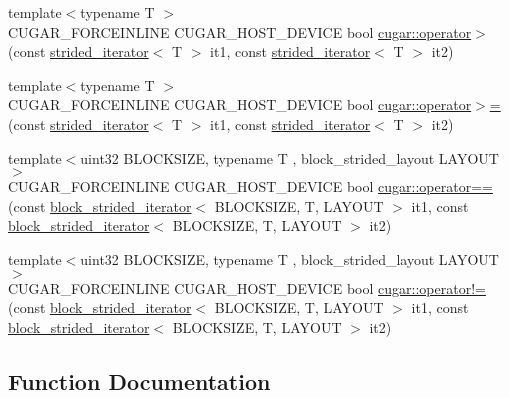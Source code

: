 \begin{DoxyCompactItemize}
\item 
{\footnotesize template$<$typename T $>$ }\\C\+U\+G\+A\+R\+\_\+\+F\+O\+R\+C\+E\+I\+N\+L\+I\+NE C\+U\+G\+A\+R\+\_\+\+H\+O\+S\+T\+\_\+\+D\+E\+V\+I\+CE bool \hyperlink{group___iterators_ga1e9e6257c01330e7b3620c9f3a81ee8f}{cugar\+::operator$>$} (const \hyperlink{structcugar_1_1strided__iterator}{strided\+\_\+iterator}$<$ T $>$ it1, const \hyperlink{structcugar_1_1strided__iterator}{strided\+\_\+iterator}$<$ T $>$ it2)
\item 
{\footnotesize template$<$typename T $>$ }\\C\+U\+G\+A\+R\+\_\+\+F\+O\+R\+C\+E\+I\+N\+L\+I\+NE C\+U\+G\+A\+R\+\_\+\+H\+O\+S\+T\+\_\+\+D\+E\+V\+I\+CE bool \hyperlink{group___iterators_ga9e4c4ee0e4663d9e1c671a22056c9533}{cugar\+::operator$>$=} (const \hyperlink{structcugar_1_1strided__iterator}{strided\+\_\+iterator}$<$ T $>$ it1, const \hyperlink{structcugar_1_1strided__iterator}{strided\+\_\+iterator}$<$ T $>$ it2)
\item 
{\footnotesize template$<$uint32 B\+L\+O\+C\+K\+S\+I\+ZE, typename T , block\+\_\+strided\+\_\+layout L\+A\+Y\+O\+UT$>$ }\\C\+U\+G\+A\+R\+\_\+\+F\+O\+R\+C\+E\+I\+N\+L\+I\+NE C\+U\+G\+A\+R\+\_\+\+H\+O\+S\+T\+\_\+\+D\+E\+V\+I\+CE bool \hyperlink{group___iterators_ga465edad50b0d8fadcb83a0eb90255327}{cugar\+::operator==} (const \hyperlink{structcugar_1_1block__strided__iterator}{block\+\_\+strided\+\_\+iterator}$<$ B\+L\+O\+C\+K\+S\+I\+ZE, T, L\+A\+Y\+O\+UT $>$ it1, const \hyperlink{structcugar_1_1block__strided__iterator}{block\+\_\+strided\+\_\+iterator}$<$ B\+L\+O\+C\+K\+S\+I\+ZE, T, L\+A\+Y\+O\+UT $>$ it2)
\item 
{\footnotesize template$<$uint32 B\+L\+O\+C\+K\+S\+I\+ZE, typename T , block\+\_\+strided\+\_\+layout L\+A\+Y\+O\+UT$>$ }\\C\+U\+G\+A\+R\+\_\+\+F\+O\+R\+C\+E\+I\+N\+L\+I\+NE C\+U\+G\+A\+R\+\_\+\+H\+O\+S\+T\+\_\+\+D\+E\+V\+I\+CE bool \hyperlink{group___iterators_gae35c875eb7c9a47d37f677f1df67f7f9}{cugar\+::operator!=} (const \hyperlink{structcugar_1_1block__strided__iterator}{block\+\_\+strided\+\_\+iterator}$<$ B\+L\+O\+C\+K\+S\+I\+ZE, T, L\+A\+Y\+O\+UT $>$ it1, const \hyperlink{structcugar_1_1block__strided__iterator}{block\+\_\+strided\+\_\+iterator}$<$ B\+L\+O\+C\+K\+S\+I\+ZE, T, L\+A\+Y\+O\+UT $>$ it2)
\end{DoxyCompactItemize}


\subsection{Function Documentation}
\mbox{\label{group___iterators_ga18b4b42492eb7224bb23b6d7703d59d3}} 
